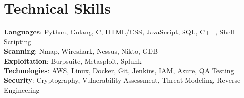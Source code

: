 \documentclass[letterpaper,11pt]{article}
\begin{document}
\section{Technical Skills}
 \begin{itemize}[leftmargin=0.15in, label={}]
    \small{\item{
     \textbf{Languages}{: Python, Golang, C, HTML/CSS, JavaScript, SQL, C++, Shell Scripting} \\
     \textbf{Scanning}{: Nmap, Wireshark, Nessus, Nikto, GDB} \\
     \textbf{Exploitation}{: Burpsuite, Metasploit, Splunk} \\
     \textbf{Technologies}{: AWS, Linux, Docker, Git, Jenkins, IAM, Azure, QA Testing} \\
     \textbf{Security}{: Cryptography, Vulnerability Assessment, Threat Modeling, Reverse Engineering} \\
    }}
 \end{itemize}
 \vspace{-16pt}
\end{document}

